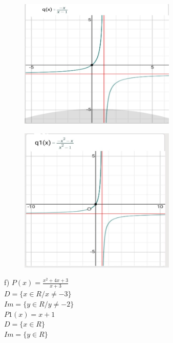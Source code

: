 \begin{respostas}{3}
	\begin{figure}[H]
		\begin{Center}
			\includegraphics[width=2.94in,height=2.43in]{capitulos/outras_funcoes/media/image53.jpeg}
		\end{Center}
	\end{figure}

	\begin{figure}[H]
		\begin{Center}
			\includegraphics[width=2.94in,height=2.74in]{capitulos/outras_funcoes/media/image54.jpeg}
		\end{Center}
	\end{figure}

	f)  \( P \left( x \right) =\frac{x^2+4x+3}{x+3}\)\\\(D= \{ x \in R/ x \neq -3 \}  \) \\\( Im= \{ y \in R/y \neq -2 \}  \)\\

	\( P1 \left( x \right) =x+1\)\\\(D= \{ x \in R \}  \) \\ \( Im= \{ y \in R \} \)


\end{respostas}
